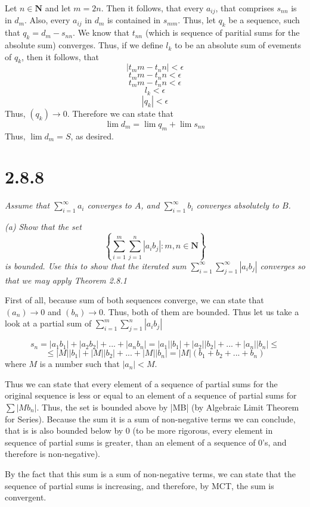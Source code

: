\documentclass[11pt,oneside,titlepage]{book}
\begin{document}
Let $n \in \textbf{N}$ and let $m = 2n$. Then it follows, that
every $a_{ij}$, that comprises $s_{nn}$ is in $d_{m}$. Also, every $a_{ij}$
in $d_{m}$ is contained in $s_{mm}$. Thus, let $q_k$ be a sequence, such that
$q_k = d_m - s_{nn}$. We know that $t_{nn}$ (which is sequence of  paritial
sums for the absolute sum) converges. Thus, if we define $l_k$ to be an
absolute sum of evements of $q_k$, then it follows, that 
$$ |t_mm - t_nn| < \epsilon $$
$$ t_mm - t_nn < \epsilon $$
$$ t_mm - t_nn < \epsilon $$
$$  l_k < \epsilon $$
$$|q_k| < \epsilon$$
Thus, $(q_k) \to 0$. Therefore we can state that
$$\lim d_m = \lim q_m + \lim s_{nn}$$
Thus, $\lim d_m = S$, as desired.

\section*{2.8.8}
\textit{Assume that $\sum_{i = 1}^{\infty} a_i$  converges to $A$, and
  $\sum_{i = 1}^{\infty} b_i$ converges absolutely to $B$.}

\textit{(a) Show that the set}
$$\left\{\sum_{i = 1}^{m}\sum_{j = 1}^{n}|a_i b_j|: m,n \in \textbf{N}\right\}$$
\textit{is bounded. Use this to show that the iterated sum
  $\sum_{i = 1}^{\infty}\sum_{j = 1}^{\infty}|a_i b_j|$ converges so that we
  may apply Theorem 2.8.1}


First of all, because sum of both sequences converge, we can state that
$(a_n) \to 0$ and $(b_n) \to 0$. Thus, both of them are bounded. Thus
let us take a look at a partial sum of $\sum_{i = 1}^{m}\sum_{j = 1}^{n}|a_i b_j|$

$$s_n = |a_1 b_1| + |a_2 b_2| + ... + |a_n b_n| =
|a_1||b_1| + |a_2 || b_2| + ... + |a_n ||b_n| \leq$$
$$\leq |M||b_1| + |M||b_2| + ... + |M||b_n| = |M|(b_1 + b_2 + ... + b_n)$$
where $M$ is a number such that $|a_n| < M$.

Thus we can state that every element of a sequence of partial sums for the
original sequence is less or equal to an element of a sequence of partial sums
for $\sum |Mb_n|$. Thus, the set is bounded above by |MB| (by Algebraic Limit
Theorem for Series). Because the sum it is a sum of non-negative terms we
can conclude, that is is also bounded below by 0 (to be more rigorous, every
element in sequence of partial sums is greater, than an element of a sequence
of 0's, and therefore is non-negative).

By the fact that this sum is a sum of non-negative terms, we can state that
the sequence of partial sums is increasing, and therefore, by MCT, the sum
is convergent.
\end{document}
